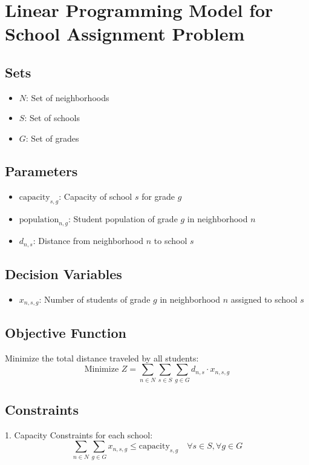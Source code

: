 \documentclass{article}
\begin{document}
\section*{Linear Programming Model for School Assignment Problem}

\subsection*{Sets}
\begin{itemize}
    \item \( N \): Set of neighborhoods
    \item \( S \): Set of schools
    \item \( G \): Set of grades
\end{itemize}

\subsection*{Parameters}
\begin{itemize}
    \item \( \text{capacity}_{s,g} \): Capacity of school \( s \) for grade \( g \)
    \item \( \text{population}_{n,g} \): Student population of grade \( g \) in neighborhood \( n \)
    \item \( d_{n,s} \): Distance from neighborhood \( n \) to school \( s \)
\end{itemize}

\subsection*{Decision Variables}
\begin{itemize}
    \item \( x_{n,s,g} \): Number of students of grade \( g \) in neighborhood \( n \) assigned to school \( s \)
\end{itemize}

\subsection*{Objective Function}
Minimize the total distance traveled by all students:
\[
\text{Minimize } Z = \sum_{n \in N} \sum_{s \in S} \sum_{g \in G} d_{n,s} \cdot x_{n,s,g}
\]

\subsection*{Constraints}
1. Capacity Constraints for each school:
\[
\sum_{n \in N} \sum_{g \in G} x_{n,s,g} \leq \text{capacity}_{s,g} \quad \forall s \in S, \forall g \in G
\]
\end{document}
